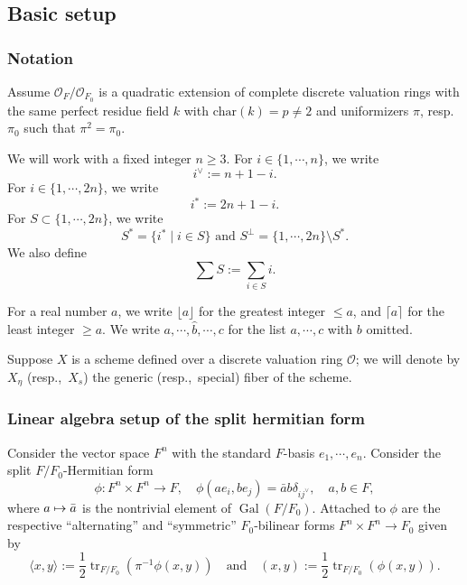 \documentclass[pdflatex,sn-mathphys-num]{sn-jnl}%
\makeatletter
\theoremstyle{thmstyleone}%
\theoremstyle{thmstyletwo}%
\numberwithin{equation}{subsection}
\theoremstyle{thmstylethree}%
\newcommand{\CO}{\ensuremath{\mathcal{O}}\xspace}
\DeclareMathOperator{\Gal}{Gal}
\DeclareMathOperator{\tr}{tr}
\newcommand{\wh}{\widehat}
\let\shortmapsto\mapsto
\renewcommand{\mapsto}{%
		\ifbool{@display}{\longmapsto}{\shortmapsto}%
	}
\makeatother
\begin{document}
		
\subsection{Basic setup}\label{moduli_setup}
\subsubsection{Notation}\label{moduli_setup_notation}
Assume $\CO_F/\CO_{F_0}$ is a quadratic extension of complete discrete valuation rings with the same perfect residue field $k$ with $\text{char}(k)=p\neq 2$ and uniformizers $\pi$, resp. $\pi_0$ such that $\pi^2=\pi_0$.

We will work with a fixed integer $n\geq 3$. For $i\in\{1,\cdots,n\}$, we write 
\begin{equation*}
    i^\vee:=n+1-i.
\end{equation*}
For $i\in \{1,\cdots,2n\}$, we write
\begin{equation*}
    i^*:=2n+1-i.
\end{equation*}
For $S\subset\{1,\cdots,2n\}$, we write
\begin{equation*}
    S^*=\{i^*\mid i\in S\}\text{ and }S^\perp=\{1,\cdots,2n\}\setminus S^*.
\end{equation*}	
We also define
\begin{equation*}
    \sum S:=\sum_{i\in S} i.
\end{equation*}
		
For a real number $a$, we write $\lfloor a\rfloor$ for the greatest integer $\leq a$, and $\lceil a\rceil$ for the least integer $\geq a$.
We write $a,\cdots,\wh{b},\cdots,c$ for the list $a,\cdots,c$ with $b$ omitted.

Suppose $X$ is a scheme defined over a discrete valuation ring $\CO$; we will denote by $X_\eta$ (resp.,\ $X_s$) the generic (resp.,\ special) fiber of the scheme.
\subsubsection{Linear algebra setup of the split hermitian form}\label{moduli_setup_alg-group}
Consider the vector space $F^n$ with the standard $F$-basis $e_1,\cdots,e_n$. Consider the split $F/F_0$-Hermitian form
\begin{equation*}\label{moduli_setup:herm}
    \phi: F^n\times F^n\rightarrow F,\quad \phi(ae_i,be_j)=\bar{a}b\delta_{ij^\vee},\quad a,b\in F,
\end{equation*}
where $a\mapsto\bar{a}$ is the nontrivial element of $\Gal(F/F_0).$ 
Attached to $\phi$ are the respective ``alternating'' and ``symmetric'' $F_0$-bilinear forms $F^n\times F^n\rightarrow F_0$ given by
\begin{equation*}
\langle x,y\rangle:=\frac{1}{2}\tr_{F/F_0}(\pi^{-1}\phi(x,y))
\quad\text{and}\quad
(x,y):=\frac{1}{2}\tr_{F/F_0}(\phi(x,y)).
\end{equation*}		
		
\end{document}
